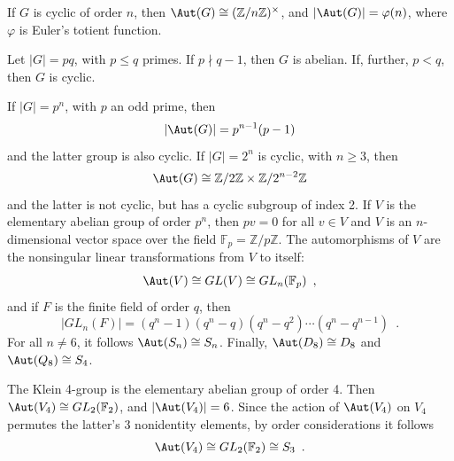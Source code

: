 \begin{proposition}
	\cite[135]{DummitFoote2004}
	If $G$ is cyclic of order $n$, then $\Aut(G) \cong (\mathbb{Z} / n \mathbb{Z})^\times$,
	and $|\Aut(G)| = \varphi(n)$, where $\varphi$ is Euler's totient function.
\end{proposition}

\begin{corollary}
	\cite[136]{DummitFoote2004}
	Let $|G| = pq$, with $p \leq q$ primes. If $p \nmid q - 1$, then $G$ is abelian.
	If, further, $p < q$, then $G$ is cyclic.
\end{corollary}

\begin{proposition}
	\cite[136]{DummitFoote2004}
	If $|G| = p^n$, with $p$ an odd prime, then
	\begin{equation}
		|\Aut(G)| = p^{n - 1} (p - 1)
	\end{equation}
	and the latter group is also cyclic. If $|G| = 2^n$ is cyclic, with $n \geq 3$, then
	\begin{equation}
		\Aut(G) \cong \mathbb{Z} / 2 \mathbb{Z} \times \mathbb{Z} / 2^{n - 2} \mathbb{Z}
	\end{equation}
	and the latter is not cyclic, but has a cyclic subgroup of index 2. If $V$ is the
	elementary abelian group of order $p^n$, then $pv = 0$ for all $v \in V$ and $V$ is an
	$n$-dimensional vector space over the field $\mathbb{F}_p = \mathbb{Z} / p \mathbb{Z}$.
	The automorphisms of $V$ are the nonsingular linear transformations from $V$ to itself:
	\pagebreak
	\begin{equation}
		\Aut(V) \cong GL(V) \cong GL_n(\mathbb{F}_p) \enspace,
	\end{equation}
	and if $F$ is the finite field of order $q$, then
	\begin{equation}
		|GL_n(F)| = (q^n - 1) (q^n - q) (q^n - q^2) \cdots (q^n - q^{n - 1}) \enspace.
	\end{equation}
	For all $n \ne 6$, it follows $\Aut(S_n) \cong S_n$. Finally, $\Aut(D_8) \cong D_8$ and
	$\Aut(Q_8) \cong S_4$.
\end{proposition}

\begin{example}
	\cite[137]{DummitFoote2004}
	The Klein 4-group is the elementary abelian group of order 4. Then
	$\Aut(V_4) \cong GL_2(\mathbb{F}_2)$, and $|\Aut(V_4)| = 6$. Since the action of
	$\Aut(V_4)$ on $V_4$ permutes the latter's 3 nonidentity elements, by order
	considerations it follows
	\begin{equation}
		\Aut(V_4) \cong GL_2(\mathbb{F}_2) \cong S_3 \enspace.
	\end{equation}
\end{example}

